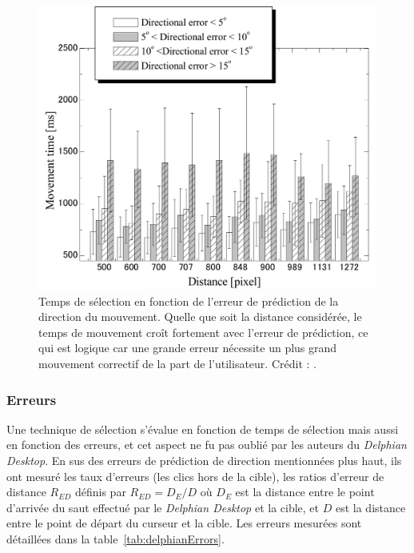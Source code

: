 	\begin{figure}[H]
		\centering
		\includegraphics[width=\textwidth]{figures/ch2/delphianTimesErrors}
		\caption[\emph{Delphian Desktop} -- temps de sélection en fonction de l'erreur de prédiction]{Temps de sélection en fonction de l'erreur de prédiction de la direction du mouvement. Quelle que soit la distance considérée, le temps de mouvement croît fortement avec l'erreur de prédiction, ce qui est logique car une grande erreur nécessite un plus grand mouvement correctif de la part de l'utilisateur. Crédit : \cite{asano2005predictive}.}
		\label{fig:delphianTimesErrors}
	\end{figure}
	
	\subsubsection{Erreurs}
	Une technique de sélection s'évalue en fonction de temps de sélection mais aussi en fonction des erreurs, et cet aspect ne fu pas oublié par les auteurs du \emph{Delphian Desktop}. En sus des erreurs de prédiction de direction mentionnées plus haut, ils ont mesuré les taux d'erreurs (les clics hors de la cible), les ratios d'erreur de distance $R_{ED}$ définis par $R_{ED} = D_{E}/D$ où $D_{E}$ est la distance entre le point d'arrivée du \og saut \fg{} effectué par le \emph{Delphian Desktop} et la cible, et $D$ est la distance entre le point de départ du curseur et la cible. Les erreurs mesurées sont détaillées dans la table~\ref{tab:delphianErrors}.
	
